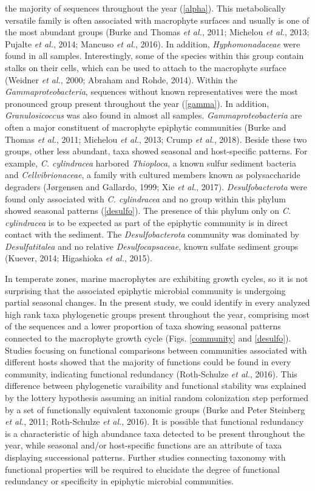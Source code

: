 \documentclass[12pt,]{article}
\begin{document}
the majority of sequences throughout the year (\autoref{alpha}). This
metabolically versatile family is often associated with macrophyte
surfaces and usually is one of the most abundant groups (Burke and
Thomas \emph{et al.}, 2011; Michelou \emph{et al.}, 2013; Pujalte
\emph{et al.}, 2014; Mancuso \emph{et al.}, 2016). In addition,
\emph{Hyphomonadaceae} were found in all samples. Interestingly, some of
the species within this group contain stalks on their cells, which can
be used to attach to the macrophyte surface (Weidner \emph{et al.},
2000; Abraham and Rohde, 2014). Within the \emph{Gammaproteobacteria},
sequences without known representatives were the most pronounced group
present throughout the year (\autoref{gamma}). In addition,
\emph{Granulosicoccus} was also found in almost all samples.
\emph{Gammaproteobacteria} are often a major constituent of macrophyte
epiphytic communities (Burke and Thomas \emph{et al.}, 2011; Michelou
\emph{et al.}, 2013; Crump \emph{et al.}, 2018). Beside these two
groups, other less abundant, taxa showed seasonal and host-specific
patterns. For example, \emph{C. cylindracea} harbored \emph{Thioploca},
a known sulfur sediment bacteria and \emph{Cellvibrionaceae}, a family
with cultured members known as polysaccharide degraders (Jørgensen and
Gallardo, 1999; Xie \emph{et al.}, 2017). \emph{Desulfobacterota} were
found only associated with \emph{C. cylindracea} and no group within
this phylum showed seasonal patterns (\autoref{desulfo}). The presence
of this phylum only on \emph{C. cylindracea} is to be expected as part
of the epiphytic community is in direct contact with the sediment. The
\emph{Desulfobacterota} community was dominated by \emph{Desulfatitalea}
and no relative \emph{Desulfocapsaceae}, known sulfate sediment groups
(Kuever, 2014; Higashioka \emph{et al.}, 2015).

In temperate zones, marine macrophytes are exhibiting growth cycles, so
it is not surprising that the associated epiphytic microbial community
is undergoing partial seasonal changes. In the present study, we could
identify in every analyzed high rank taxa phylogenetic groups present
throughout the year, comprising most of the sequences and a lower
proportion of taxa showing seasonal patterns connected to the macrophyte
growth cycle (Figs. \ref{community} and \ref{desulfo}). Studies focusing
on functional comparisons between communities associated with different
hosts showed that the majority of functions could be found in every
community, indicating functional redundancy (Roth-Schulze \emph{et al.},
2016). This difference between phylogenetic varaibility and functional
stability was explained by the lottery hypothesis assuming an initial
random colonization step performed by a set of functionally equivalent
taxonomic groups (Burke and Peter Steinberg \emph{et al.}, 2011;
Roth-Schulze \emph{et al.}, 2016). It is possible that functional
redundancy is a characteristic of high abundance taxa detected to be
present throughout the year, while seasonal and/or host-specific
functions are an attribute of taxa displaying successional patterns.
Further studies connecting taxonomy with functional properties will be
required to elucidate the degree of functional redundancy or specificity
in epiphytic microbial communities.
\end{document}

